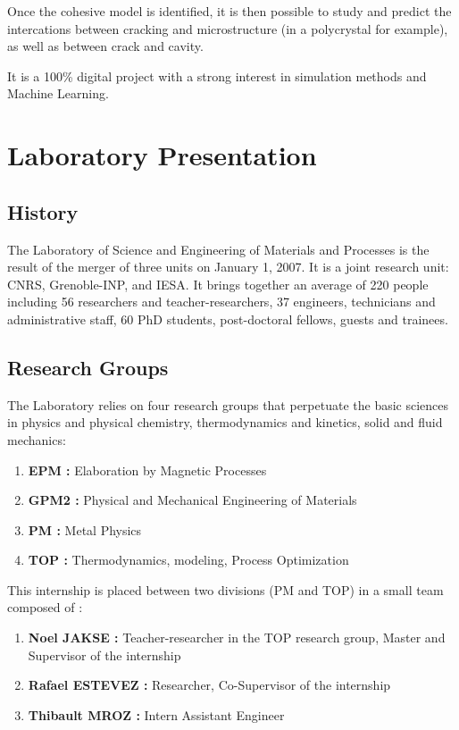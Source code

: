     Once the cohesive model is identified, it is then possible to study and predict the intercations between cracking and microstructure (in a polycrystal for example), as well as between crack and cavity. \medskip

    It is a 100\% digital project with a strong interest in simulation methods and Machine Learning.

\section{Laboratory Presentation}

    \subsection{History}

        The Laboratory of Science and Engineering of Materials and Processes is the result of the merger of three units on January 1, 2007. It is a joint research unit: CNRS, Grenoble-INP, and IESA. It brings together an average of 220 people including 56 researchers and teacher-researchers, 37 engineers, technicians and administrative staff, 60 PhD students, post-doctoral fellows, guests and trainees. 

    \subsection{Research Groups}

        The Laboratory relies on four research groups that perpetuate the basic sciences in physics and physical chemistry, thermodynamics and kinetics, solid and fluid mechanics: 

        \begin{enumerate}[\hspace{3em}$\bullet$]
            \item \textbf{EPM : }Elaboration by Magnetic Processes
            \item \textbf{GPM2 : }Physical and Mechanical Engineering of Materials
            \item \textbf{PM : }Metal Physics
            \item \textbf{TOP : }Thermodynamics, modeling, Process Optimization
        \end{enumerate}
    
        This internship is placed between two divisions (PM and TOP) in a small team composed of : 

        \begin{enumerate}[\hspace{3em}$\bullet$]
            \item \textbf{Noel JAKSE : }Teacher-researcher in the TOP research group, Master and Supervisor of the internship
            \item \textbf{Rafael ESTEVEZ : }Researcher, Co-Supervisor of the internship
            \item \textbf{Thibault MROZ : }Intern Assistant Engineer
        \end{enumerate}

